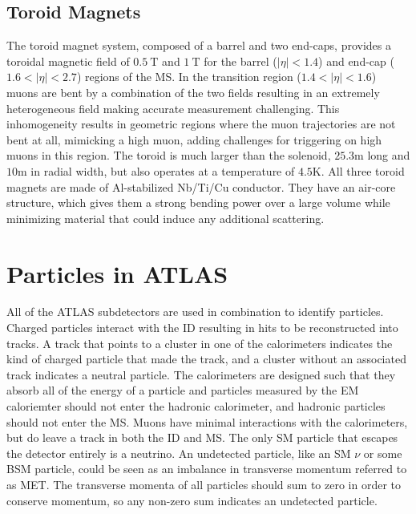 \subsection{Toroid Magnets}

The toroid magnet system, composed of a barrel and two end-caps, provides a toroidal magnetic field of $0.5~\textrm{T}$ and $1~\textrm{T}$ for the barrel ($|\eta| < 1.4$) and end-cap ($1.6 <|\eta| < 2.7$) regions of the \ac{MS}. In the transition region ($1.4 < |\eta| < 1.6$) muons are bent by a combination of the two fields resulting in an extremely heterogeneous field making accurate measurement challenging. This inhomogeneity results in geometric regions where the muon trajectories are not bent at all, mimicking a high \pt muon, adding challenges for triggering on high \pt muons in this region. The toroid is much larger than the solenoid, $25.3 \textrm{m}$ long and $10 \textrm{m}$ in radial width, but also operates at a temperature of $4.5 \textrm{K}$. All three toroid magnets are made of Al-stabilized Nb/Ti/Cu conductor. They have an air-core structure, which gives them a strong bending power over a large volume while minimizing material that could induce any additional scattering. 


\section{Particles in ATLAS}
All of the \ac{ATLAS} subdetectors are used in combination to identify particles. Charged particles interact with the \ac{ID} resulting in hits to be reconstructed into tracks. A track that points to a cluster in one of the calorimeters indicates the kind of charged particle that made the track, and a cluster without an associated track indicates a neutral particle. The calorimeters are designed such that they absorb all of the energy of a particle and particles measured by the \ac{EM} caloriemter should not enter the hadronic calorimeter, and hadronic particles should not enter the \ac{MS}. Muons have minimal interactions with the calorimeters, but do leave a track in both the \ac{ID} and \ac{MS}. The only \ac{SM} particle that escapes the detector entirely is a neutrino. An undetected particle, like an \ac{SM} $\nu$ or some \ac{BSM} particle, could be seen as an imbalance in transverse momentum referred to as \ac{MET}. The transverse momenta of all particles should sum to zero in order to conserve momentum, so any non-zero sum indicates an undetected particle.



